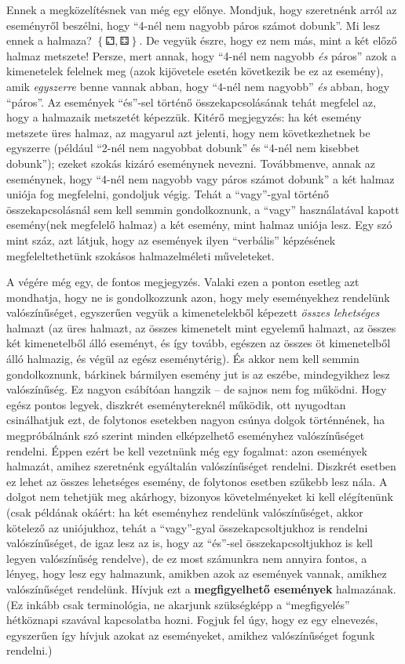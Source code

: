 \documentclass[magyar,]{book}
\begin{document}
Ennek a megközelítésnek van még egy előnye. Mondjuk, hogy szeretnénk arról az eseményről beszélni, hogy \enquote{4-nél nem nagyobb páros számot dobunk}. Mi lesz ennek a halmaza? \(\left\{⚁,⚃\right\}\). De vegyük észre, hogy ez nem más, mint a két előző halmaz metszete! Persze, mert annak, hogy \enquote{4-nél nem nagyobb \emph{és} páros} azok a kimenetelek felelnek meg (azok kijövetele esetén következik be ez az esemény), amik \emph{egyszerre} benne vannak abban, hogy \enquote{4-nél nem nagyobb} \emph{és} abban, hogy \enquote{páros}. Az események \enquote{és}-sel történő összekapcsolásának tehát megfelel az, hogy a halmazaik metszetét képezzük. Kitérő megjegyzés: ha két esemény metszete üres halmaz, az magyarul azt jelenti, hogy nem következhetnek be egyszerre (például \enquote{2-nél nem nagyobbat dobunk} és \enquote{4-nél nem kisebbet dobunk}); ezeket szokás kizáró eseménynek nevezni. Továbbmenve, annak az eseménynek, hogy \enquote{4-nél nem nagyobb vagy páros számot dobunk} a két halmaz uniója fog megfelelni, gondoljuk végig. Tehát a \enquote{vagy}-gyal történő összekapcsolásnál sem kell semmin gondolkoznunk, a \enquote{vagy} használatával kapott esemény(nek megfelelő halmaz) a két esemény, mint halmaz uniója lesz. Egy szó mint száz, azt látjuk, hogy az események ilyen \enquote{verbális} képzésének megfeleltethetünk szokásos halmazelméleti műveleteket.

A végére még egy, de fontos megjegyzés. Valaki ezen a ponton esetleg azt mondhatja, hogy ne is gondolkozzunk azon, hogy mely eseményekhez rendelünk valószínűséget, egyszerűen vegyük a kimenetelekből képezett \emph{összes lehetséges} halmazt (az üres halmazt, az összes kimenetelt mint egyelemű halmazt, az összes két kimenetelből álló eseményt, és így tovább, egészen az összes öt kimenetelből álló halmazig, és végül az egész eseménytérig). És akkor nem kell semmin gondolkoznunk, bárkinek bármilyen esemény jut is az eszébe, mindegyikhez lesz valószínűség. Ez nagyon csábítóan hangzik -- de sajnos nem fog működni. Hogy egész pontos legyek, diszkrét eseménytereknél működik, ott nyugodtan csinálhatjuk ezt, de folytonos esetekben nagyon csúnya dolgok történnének, ha megpróbálnánk szó szerint minden elképzelhető eseményhez valószínűséget rendelni. Éppen ezért be kell vezetnünk még egy fogalmat: azon események halmazát, amihez szeretnénk egyáltalán valószínűséget rendelni. Diszkrét esetben ez lehet az összes lehetséges esemény, de folytonos esetben szűkebb lesz nála. A dolgot nem tehetjük meg akárhogy, bizonyos követelményeket ki kell elégítenünk (csak példának okáért: ha két eseményhez rendelünk valószínűséget, akkor kötelező az uniójukhoz, tehát a \enquote{vagy}-gyal összekapcsoltjukhoz is rendelni valószínűséget, de igaz lesz az is, hogy az \enquote{és}-sel összekapcsoltjukhoz is kell legyen valószínűség rendelve), de ez most számunkra nem annyira fontos, a lényeg, hogy lesz egy halmazunk, amikben azok az események vannak, amikhez valószínűséget rendelünk. Hívjuk ezt a \textbf{megfigyelhető események} halmazának. (Ez inkább csak terminológia, ne akarjunk szükségképp a \enquote{megfigyelés} hétköznapi szavával kapcsolatba hozni. Fogjuk fel úgy, hogy ez egy elnevezés, egyszerűen így hívjuk azokat az eseményeket, amikhez valószínűséget fogunk rendelni.)
\end{document}
